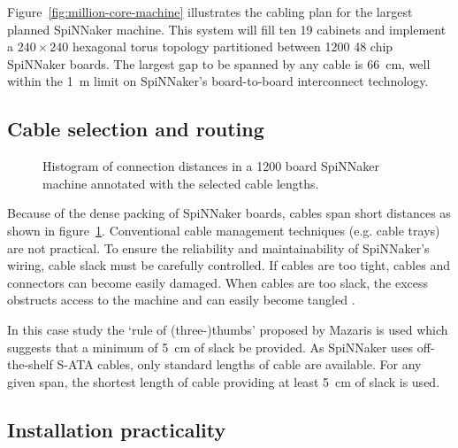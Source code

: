 			Figure~\ref{fig:million-core-machine} illustrates the cabling plan for
			the largest planned SpiNNaker machine. This system will fill ten
			19\inch{} cabinets and implement a $240 \times 240$ hexagonal torus
			topology partitioned between \num{1200} 48 chip SpiNNaker boards. The
			largest gap to be spanned by any cable is \SI{66}{\centi\meter}, well
			within the \SI{1}{\meter} limit on SpiNNaker's board-to-board
			interconnect technology.
			
		\subsection{Cable selection and routing}
			
			\begin{figure}
				
				\center
				
				\caption[Cable lengths in a \num{1200}~board SpiNNaker machine.]%
				{Histogram of connection distances in a \num{1200} board SpiNNaker
				machine annotated with the selected cable lengths.}
				\label{fig:wire-length-histogram}
				
			\end{figure}
			
			Because of the dense packing of SpiNNaker boards, cables span short
			distances as shown in figure~\ref{fig:wire-length-histogram}.
			Conventional cable management techniques (e.g. cable trays) are not
			practical. To ensure the reliability and maintainability of SpiNNaker's
			wiring, cable slack must be carefully controlled.  If cables are too
			tight, cables and connectors can become easily damaged.  When cables are
			too slack, the excess obstructs access to the machine and can easily
			become tangled \cite{cisco07}.
			
			In this case study the `rule of (three-)thumbs' proposed by Mazaris
			\cite{mazaris97} is used which suggests that a minimum of
			\SI{5}{\centi\meter} of slack be provided. As SpiNNaker uses
			off-the-shelf S-ATA cables, only standard lengths of cable are available.
			For any given span, the shortest length of cable providing at least
			\SI{5}{\centi\meter} of slack is used.
		
		\subsection{Installation practicality}
			
